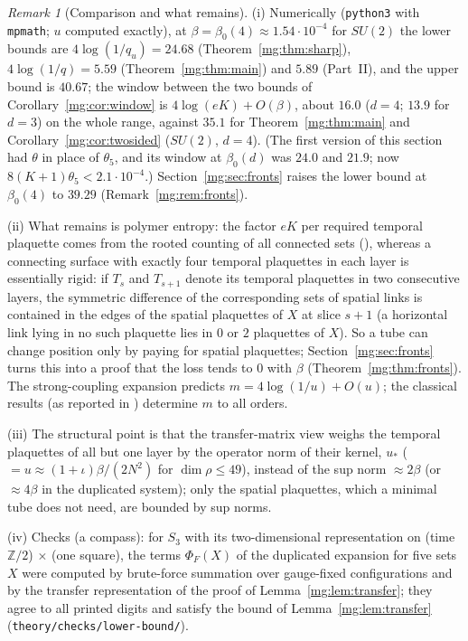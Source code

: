 \documentclass[11pt,a4paper]{article}
\theoremstyle{definition}
\theoremstyle{remark}
\newtheorem{remark}[theorem]{Remark}
\newcommand{\IIIlab}[2]{\cite[#1 \texttt{#2}]{III}}
\begin{document}
\begin{remark}[Comparison and what remains]\label{mg:rem:sharp}
(i) Numerically (\texttt{python3} with \texttt{mpmath}; $u$ computed exactly), at $\beta=\beta_0(4)\approx1.54\cdot10^{-4}$ for $SU(2)$ the
lower bounds are $4\log(1/q_u)=24.68$ (Theorem~\ref{mg:thm:sharp}), $4\log(1/q)=5.59$ (Theorem~\ref{mg:thm:main}) and $5.89$ (Part~II), and
the upper bound is $40.67$; the window between the two bounds of Corollary~\ref{mg:cor:window} is $4\log(eK)+O(\beta)$, about $16.0$ ($d=4$; $13.9$ for
$d=3$) on the whole range, against $35.1$ for Theorem~\ref{mg:thm:main} and Corollary~\ref{mg:cor:twosided} ($SU(2)$, $d=4$). (The first version of this
section had $\theta$ in place of $\theta_5$, and its window at $\beta_0(d)$ was $24.0$ and $21.9$; now $8(K+1)\theta_5<2.1\cdot10^{-4}$.)
Section~\ref{mg:sec:fronts} raises the lower bound at $\beta_0(4)$ to $39.29$ (Remark~\ref{mg:rem:fronts}).

(ii) What remains is polymer entropy: the factor $eK$ per required temporal plaquette comes from the rooted counting of all connected sets
(\IIIlab{Lemma}{al:lem:rooted}), whereas a connecting surface with exactly four temporal plaquettes in each layer is essentially rigid: if
$T_s$ and $T_{s+1}$ denote its temporal plaquettes in two consecutive layers, the symmetric difference of the corresponding sets of spatial
links is contained in the edges of the spatial plaquettes of $X$ at slice $s+1$ (a horizontal link lying in no such plaquette lies in $0$ or
$2$ plaquettes of $X$). So a tube can change position only by paying for spatial plaquettes; Section~\ref{mg:sec:fronts} turns this into a proof that the loss
tends to $0$ with $\beta$ (Theorem~\ref{mg:thm:fronts}). The strong-coupling expansion predicts $m=4\log(1/u)+O(u)$; the classical results
\cite{Sch83,Sch84a,Sch84b} (as reported in \cite{FO25}) determine $m$ to all orders.

(iii) The structural point is that the transfer-matrix view weighs the temporal plaquettes of all but one layer by the operator norm of their
kernel, $u_*$ ($=u\approx(1+\iota)\beta/(2N^2)$ for $\dim\rho\le49$), instead of the sup norm $\approx2\beta$ (or $\approx4\beta$ in the duplicated system); only the spatial
plaquettes, which a minimal tube does not need, are bounded by sup norms.

(iv) Checks (a compass): for $S_3$ with its two-dimensional representation on (time $\mathbb Z/2$) $\times$ (one square), the terms
$\Phi_F(X)$ of the duplicated expansion for five sets $X$ were computed by brute-force summation over gauge-fixed configurations and by the
transfer representation of the proof of Lemma~\ref{mg:lem:transfer}; they agree to all printed digits and satisfy the bound of
Lemma~\ref{mg:lem:transfer} (\texttt{theory/checks/lower-bound/}).
\end{remark}
\end{document}
